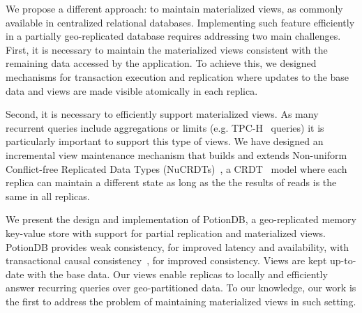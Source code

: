 \documentclass[sigplan,twocolumn,review,anonymous]{acmart}
\begin{document}
We propose a different approach: to maintain materialized views, as commonly available in centralized 
relational databases.
Implementing such feature efficiently in a partially geo-replicated database requires 
addressing two main challenges. 
First, it is necessary to maintain the materialized views consistent with the remaining data
accessed by the application. 
To achieve this, we designed mechanisms for transaction execution and replication where updates 
to the base data and views are made visible atomically in each replica.

Second, it is necessary to efficiently support materialized views. 
As many recurrent queries include aggregations or limits (e.g. TPC-H~\cite{tpch} queries)
it is particularly important to support
this type of views. We have designed an incremental view maintenance 
mechanism that builds and extends 
Non-uniform Conflict-free Replicated Data Types (NuCRDTs)~\cite{Cabrita17Nonuniform}, 
a CRDT~\cite{crdt} model where each replica can maintain a different state as long as the 
the results of reads is the same in all replicas. 




We present the design and implementation of PotionDB, a geo-replicated memory key-value store with support  
for partial replication and materialized views. 
PotionDB provides weak consistency, for improved latency and availability,  with transactional 
causal consistency~\cite{cure}, for improved consistency.
Views are kept up-to-date with the base data. 
Our views enable replicas to locally and efficiently answer recurring queries over geo-partitioned data. %
To our knowledge, our work is the first to address the problem of maintaining materialized views in such setting.  
\end{document}
